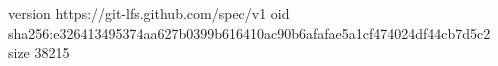 version https://git-lfs.github.com/spec/v1
oid sha256:e326413495374aa627b0399b616410ac90b6afafae5a1cf474024df44cb7d5c2
size 38215
